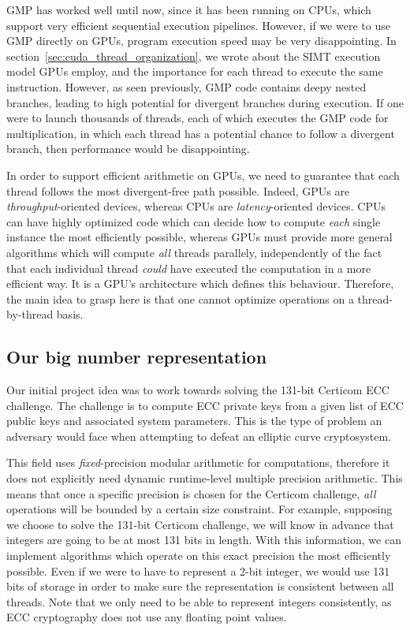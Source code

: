 \documentclass[10pt, a4paper]{report}
\begin{document}
GMP has worked well until now, since it has been running on CPUs, which support
very efficient sequential execution pipelines.
However, if we were to use GMP directly on GPUs, program execution speed may be
very disappointing.
In section~\ref{sec:cuda_thread_organization}, we wrote about the SIMT execution
model GPUs employ, and the importance for each thread to execute the same
instruction.
However, as seen previously, GMP code contains deepy nested branches, leading to
high potential for divergent branches during execution.
If one were to launch thousands of threads, each of which executes the GMP code
for multiplication, in which each thread has a potential chance to follow a
divergent branch, then performance would be disappointing.

In order to support efficient arithmetic on GPUs, we need to guarantee that each
thread follows the most divergent-free path possible.
Indeed, GPUs are \emph{throughput}-oriented devices, whereas CPUs are
\emph{latency}-oriented devices.
CPUs can have highly optimized code which can decide how to compute \emph{each}
single instance the most efficiently possible, whereas GPUs must provide more
general algorithms which will compute \emph{all} threads parallely,
independently of the fact that each individual thread \emph{could} have executed
the computation in a more efficient way.
It is a GPU's architecture which defines this behaviour.
Therefore, the main idea to grasp here is that one cannot optimize operations on
a thread-by-thread basis.

\subsection{Our big number representation}
Our initial project idea was to work towards solving the 131-bit Certicom ECC
challenge.
The challenge is to compute ECC private keys from a given list of ECC public
keys and associated system parameters. This is the type of problem an adversary
would face when attempting to defeat an elliptic curve cryptosystem.

This field uses \emph{fixed}-precision modular arithmetic for computations,
therefore it does not explicitly need dynamic runtime-level multiple precision
arithmetic.
This means that once a specific precision is chosen for the Certicom challenge,
\emph{all} operations will be bounded by a certain size constraint.
For example, supposing we choose to solve the 131-bit Certicom challenge, we
will know in advance that integers are going to be at most 131 bits in length.
With this information, we can implement algorithms which operate on this exact
precision the most efficiently possible.
Even if we were to have to represent a 2-bit integer, we would use 131 bits of
storage in order to make sure the representation is consistent between all
threads.
Note that we only need to be able to represent integers consistently, as
ECC cryptography does not use any floating point values.
\end{document}
